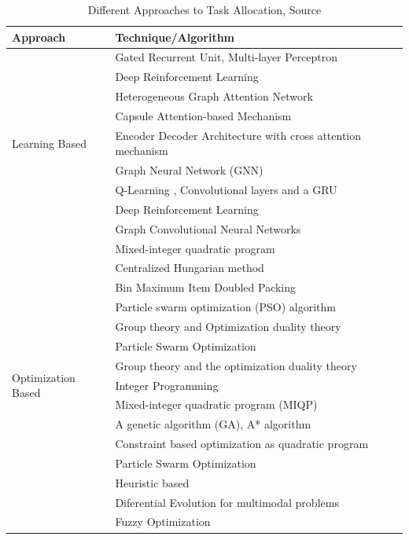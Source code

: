 \begin{table}[H]
    \centering
    \renewcommand{\arraystretch}{1.2} %
    \begin{tabular}{|l|l|}
        \hline
        \textbf{Approach} & \textbf{Technique/Algorithm} \\ 
        \hline
        \multirow{9}{*}{Learning Based} 
        & Gated Recurrent Unit, Multi-layer Perceptron \cite{9700783} \\
        & Deep Reinforcement Learning \cite{app11072895} \\
        & Heterogeneous Graph Attention Network \\
        & Capsule Attention-based Mechanism \\
        & Encoder Decoder Architecture with cross attention mechanism \\
        & Graph Neural Network (GNN) \\
        & Q-Learning , Convolutional layers and a GRU \\
        & Deep Reinforcement Learning \\
        & Graph Convolutional Neural Networks \\
        \hline
        \multirow{15}{*}{Optimization Based} 
        & Mixed-integer quadratic program \\
        & Centralized Hungarian method \cite{Lindsay2021} \\
        & Bin Maximum Item Doubled Packing \\
        & Particle swarm optimization (PSO) algorithm \\
        & Group theory and Optimization duality theory \\
        & Particle Swarm Optimization \\
        & Group theory and the optimization duality theory \\
        & Integer Programming \\
        & Mixed-integer quadratic program (MIQP) \\
        & A genetic algorithm (GA), A* algorithm \\
        & Constraint based optimization as quadratic program \\
        & Particle Swarm Optimization \\
        & Heuristic based \\
        & Diferential Evolution for multimodal problems \\
        & Fuzzy Optimization \\
        \hline
    \end{tabular}
    \caption{Different Approaches to Task Allocation, Source \cite{10.1145/3700591}}
    \label{tab:task-allocation-approaches-2}
\end{table}

